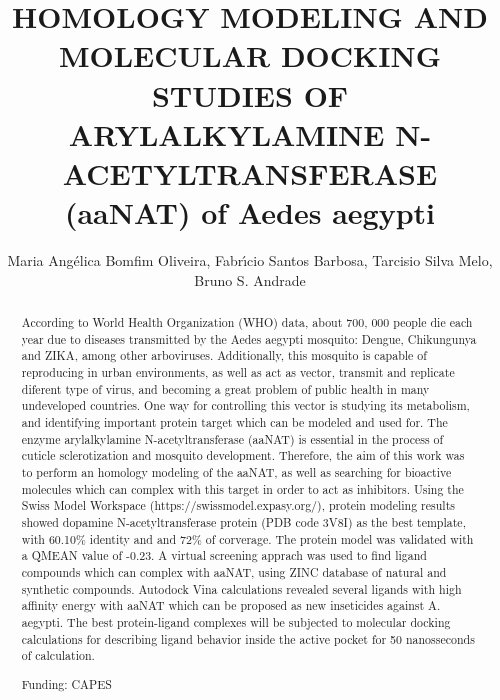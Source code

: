 \documentclass[twoside]{article}
\title{\vspace{-15mm}\fontsize{24pt}{10pt}\selectfont\textbf{ HOMOLOGY MODELING AND MOLECULAR DOCKING STUDIES OF ARYLALKYLAMINE N-ACETYLTRANSFERASE (aaNAT) of Aedes aegypti }} %
\author{ Maria Ang\'elica Bomfim Oliveira, Fabr\'{\i}cio Santos Barbosa, Tarcisio Silva Melo, Bruno S. Andrade }
\affil{ Universidade Estadual do Sudoeste da Bahia,  Brazil. }
\date{}
\begin{document}
  
  
  \maketitle %
  
  
  \thispagestyle{fancy} %
  
  
  \begin{abstract}
  According to World Health Organization (WHO) data,  about 700, 000 people die each year due to diseases transmitted by the Aedes aegypti mosquito: Dengue,  Chikungunya and ZIKA,  among other arboviruses. Additionally,  this mosquito is capable of reproducing in urban environments,  as well as act as vector,  transmit and replicate diferent type of virus,  and becoming a great problem of public health in many undeveloped countries. One way for controlling this vector is studying its metabolism,  and identifying important protein target which can be modeled and used for. The enzyme arylalkylamine N-acetyltransferase (aaNAT) is essential in the process of cuticle sclerotization and mosquito development. Therefore,  the aim of this work was to perform an homology modeling of the aaNAT,  as well as searching for bioactive molecules which can complex with this target in order to act as inhibitors. Using the Swiss Model Workspace (https://swissmodel.expasy.org/),  protein modeling results showed dopamine N-acetyltransferase protein (PDB code 3V8I) as the best template,  with 60.10\% identity and and 72\% of corverage. The protein model was validated with a QMEAN value of -0.23. A virtual screening apprach was used to find ligand compounds which can complex with aaNAT,  using ZINC database of natural and synthetic compounds. Autodock Vina calculations revealed several ligands with high affinity energy with aaNAT which can be proposed as new inseticides against A. aegypti. The best protein-ligand complexes will be subjected to molecular docking calculations for describing ligand behavior inside the active pocket for 50 nanosseconds of calculation.
  
  Funding: CAPES \\ 
  \end{abstract}
  
\end{document}
